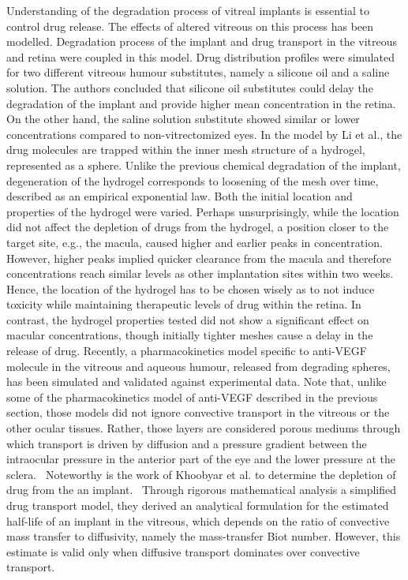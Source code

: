 \documentclass[12pt,a4paper]{journal}
\begin{document}
Understanding of the degradation process of vitreal implants is essential to control drug release.
The effects of altered vitreous on this process has been modelled.\cite{Ferreira_2020}
Degradation process of the implant and drug transport in the vitreous and retina were coupled in this model.
Drug distribution profiles were simulated for two different vitreous humour substitutes, namely a silicone oil and a saline solution.
The authors concluded that silicone oil substitutes could delay the degradation of the implant and provide higher mean concentration in the retina.
On the other hand, the saline solution substitute showed similar or lower concentrations compared to non-vitrectomized eyes.\cite{Ferreira_2020}
In the model by Li et al., the drug molecules are trapped within the inner mesh structure of a hydrogel, represented as a sphere.\cite{Li_2022}
Unlike the previous chemical degradation of the implant, degeneration of the hydrogel corresponds to loosening of the mesh over time, described as an empirical exponential law.
Both the initial location and properties of the hydrogel were varied.
Perhaps unsurprisingly, while the location did not affect the depletion of drugs from the hydrogel, a position closer to the target site, e.g., the macula, caused higher and earlier peaks in concentration.
However, higher peaks implied quicker clearance from the macula and therefore concentrations reach similar levels as other implantation sites within two weeks.\cite{Li_2022}
Hence, the location of the hydrogel has to be chosen wisely as to not induce toxicity while maintaining therapeutic levels of drug within the retina.
In contrast, the hydrogel properties tested did not show a significant effect on macular concentrations, though initially tighter meshes cause a delay in the release of drug.
Recently, a pharmacokinetics model specific to anti-VEGF molecule in the vitreous and aqueous humour, released from degrading spheres, has been simulated and validated against experimental data.\cite{Heljak_2022}
Note that, unlike some of the pharmacokinetics model of anti-VEGF described in the previous section, those models did not ignore convective transport in the vitreous or the other ocular tissues.
Rather, those layers are considered porous mediums through which transport is driven by diffusion and a pressure gradient between the intraocular pressure in the anterior part of the eye and the lower pressure at the sclera.~\cite{Ferreira_2018,Ferreira_2020,Heljak_2022,Khoobyar_2021,Li_2022}
Noteworthy is the work of Khoobyar et al. to determine the depletion of drug from the an implant.~\cite{Khoobyar_2022}
Through rigorous mathematical analysis a simplified drug transport model, they derived an analytical formulation for the estimated half-life of an implant in the vitreous, which depends on the ratio of convective mass transfer to diffusivity, namely the mass-transfer Biot number.
However, this estimate is valid only when diffusive transport dominates over convective transport.
\end{document}
